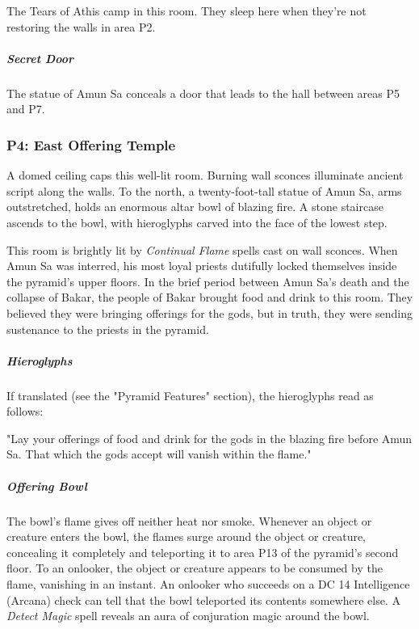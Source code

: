 \documentclass[10pt,a4paper,twoside,bg=print,twocolumn,openany,nodeprecatedcode]{dndbook}
\begin{document}
The Tears of Athis camp in this room. They sleep here when they're not restoring the walls in area P2.

\subparagraph{Secret Door}
The statue of Amun Sa conceals a door that leads to the hall between areas P5 and P7.

\subsubsection{P4: East Offering Temple}
\begin{DndReadAloud}{}
A domed ceiling caps this well-lit room. Burning wall sconces illuminate ancient script along the walls. To the north, a twenty-foot-tall statue of Amun Sa, arms outstretched, holds an enormous altar bowl of blazing fire. A stone staircase ascends to the bowl, with hieroglyphs carved into the face of the lowest step.

\end{DndReadAloud}

This room is brightly lit by \textit{Continual Flame} spells cast on wall sconces. When Amun Sa was interred, his most loyal priests dutifully locked themselves inside the pyramid's upper floors. In the brief period between Amun Sa's death and the collapse of Bakar, the people of Bakar brought food and drink to this room. They believed they were bringing offerings for the gods, but in truth, they were sending sustenance to the priests in the pyramid.

\subparagraph{Hieroglyphs}
If translated (see the "Pyramid Features" section), the hieroglyphs read as follows:

\begin{DndReadAloud}{}
"Lay your offerings of food and drink for the gods in the blazing fire before Amun Sa. That which the gods accept will vanish within the flame."

\end{DndReadAloud}

\subparagraph{Offering Bowl}
The bowl's flame gives off neither heat nor smoke. Whenever an object or creature enters the bowl, the flames surge around the object or creature, concealing it completely and teleporting it to area P13 of the pyramid's second floor. To an onlooker, the object or creature appears to be consumed by the flame, vanishing in an instant. An onlooker who succeeds on a DC 14 Intelligence (Arcana) check can tell that the bowl teleported its contents somewhere else. A \textit{Detect Magic} spell reveals an aura of conjuration magic around the bowl.
\end{document}
